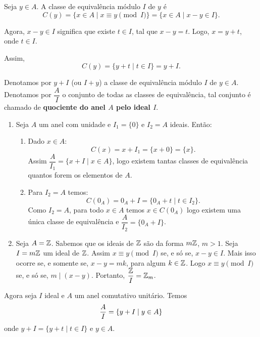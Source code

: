 Seja $y \in A$. A classe de equival{\^e}ncia m{\'o}dulo $I$ de $y$ {\'e}
\[
	C(y) = \{x \in A \mid x\equiv y \pmod I\} = \{x \in A \mid x - y \in I\}.
\]

Agora, $x - y \in I$ significa que existe $t \in I$, tal que $x - y = t$. Logo, $x = y + t$, onde $t \in I$.

Assim,
\[
	C(y) = \{y + t\mid t \in I\} = y + I.
\]

\begin{observacao}
	Denotamos por $y + I$ (ou $I + y$) a classe de equival{\^e}ncia m{\'o}dulo $I$ de $y \in A$. Denotamos por $\dfrac{A}{I}$ o conjunto de todas as classes de equival{\^e}ncia, tal conjunto {\'e} chamado de \textbf{quociente do anel $A$ pelo ideal $I$}.
\end{observacao}

\begin{exemplos}
	\begin{enumerate}[label={\arabic*})]
		\item Seja $A$ um anel com unidade e $I_{1} = \{0\}$ e $I_{2} = A$ ideais. Ent\~ao:
		\begin{enumerate}[label={\roman*})]
		\item Dado $x \in A$:
		\[
			C(x) = x + I_{1} = \{x + 0\} = \{x\}.
		\]
		Assim $\dfrac{A}{I_{1}} = \{x + I \mid x \in A\}$, logo existem tantas classes de equival{\^e}ncia quantos forem os elementos de $A$.

		\item Para $I_{2} = A$ temos:
		\[
			C(0_A) = 0_A + I = \{0_A + t \mid t \in I_{2}\}.
		\]
		Como $I_2 = A$, para todo $x \in A$ temos $x \in C(0_A)$ logo existem uma \'unica classe de equival\^encia
		e $\dfrac{A}{I_{2}} = \{0_{A} + I\}$.
	\end{enumerate}

	\item Seja $A = \mathbb{Z}$. Sabemos que os ideais de $\mathbb{Z}$ s{\~a}o da forma $m\mathbb{Z}$, $m > 1$. Seja $I = m\mathbb{Z}$ um ideal de $\mathbb{Z}$. Assim $x\equiv y \pmod I$ se, e s\'o se, $x - y \in I$. Mais isso ocorre se, e somente se, $x - y = mk $, para algum $k \in \mathbb{Z}$. Logo $x\equiv y \pmod I$ se, e s\'o se, $m\mid (x - y)$. Portanto, $\dfrac{\mathbb{Z}}{I} = \mathbb{Z}_m$.
	\end{enumerate}
\end{exemplos}


Agora seja $I$ ideal e $A$ um anel comutativo unitário. Temos
\[
	\dfrac{A}{I} = \{y + I \mid y \in A\}\\
\]
onde $y + I = \{y + t \mid t \in I\}$ e $y \in A$.

